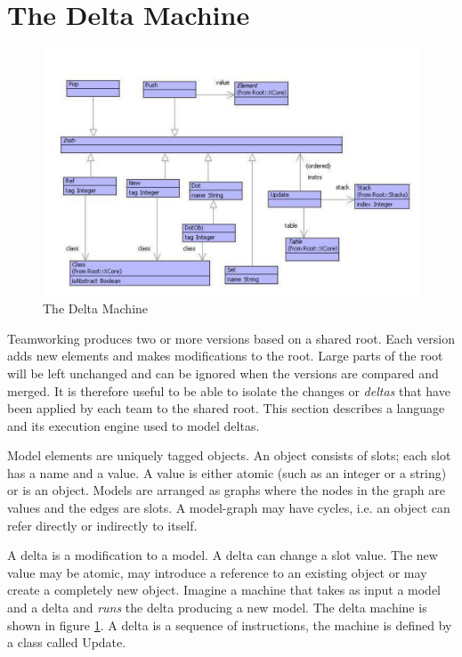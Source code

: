 \section{The Delta Machine}

%
\begin{figure}
\begin{center}

\includegraphics[width=12cm]{Programming/Teams/Images/Delta.pdf}

\caption{The Delta Machine\label{fig:The-Delta-Model}}

\end{center}
\end{figure}


Teamworking produces two or more versions based on a shared root.
Each version adds new elements and makes modifications to the root.
Large parts of the root will be left unchanged and can be ignored
when the versions are compared and merged. It is therefore useful
to be able to isolate the changes or \textit{deltas} that have been
applied by each team to the shared root. This section describes a
language and its execution engine used to model deltas.

Model elements are uniquely tagged objects. An object consists of
slots; each slot has a name and a value. A value is either atomic
(such as an integer or a string) or is an object. Models are arranged
as graphs where the nodes in the graph are values and the edges are
slots. A model-graph may have cycles, i.e. an object can refer directly
or indirectly to itself.

A delta is a modification to a model. A delta can change a slot value.
The new value may be atomic, may introduce a reference to an existing
object or may create a completely new object. Imagine a machine that
takes as input a model and a delta and \textit{runs} the delta producing
a new model. The delta machine is shown in figure \ref{fig:The-Delta-Model}.
A delta is a sequence of instructions, the machine is defined by a
class called Update.

